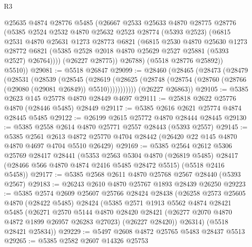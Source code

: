 \begin{lexlean}{R3}
\begin{coremodule}
            @25635
            @4874
            @28776
            @5485
            (@26667
              @2533
              @25633
              @4870
              @28775
              @28776
              (@5385
                @2524
                @2532
                @4870
                @25632
                @2523
                @28774
                (@5393 @2523)
                (@6815
                  @2531
                  @4870
                  @25631
                  @1273
                  @28773
                  @6821
                  (@6815
                    @2530
                    @4870
                    @25630
                    @1273
                    @28772
                    @6821
                    (@5385 @2528 @2018 @4870 @25629 @2527 @25881 (@5393 @2527) @26764))))
              (@26227 @28775))
            @26788)
          (@5518 @28776 @25892))
        @5510))
@29081 := @5518 @26847
@29099 := @28460
    (@28465
      (@28473
        (@28479
          (@28531
            (@28539
              (@28545
                (@28619
                  (@28625 (@28748 (@28754 (@28760 (@28766 (@29080 (@29081 @26849)) @5510)))))))))))
      (@26227 @26863))
@29105 := @5385 @2623 @145 @25778 @4870 @28449 @4697
@29111 := @25818 @2622 @25776 @4870 (@28446 @5485) @28449
@29117 := @5385 @2616 @2621 @25774 @4874 @28445 @5485
@29122 := @26199 @2615 @25772 @4870 @28444 @28445
@29130 := @5385 @2558 @2614 @4870 @25771 @2557 @28443 (@5393 @2557)
@29145 := @5385
    @2561
    @2613
    @4872
    @25770
    @4704
    @28442
    (@26420 @22 @145 @4870 @4870 @4697 @4704 @5510 @26429)
@29169 := @5385
    @2564
    @2612
    @5306
    @25769
    @28417
    @28441
    (@5353
      @2563
      @5304
      @4870
      (@26819 @5485)
      @28417
      (@28466 @566 @4870 @4874 @2416 @5485 @28472 @5515)
      (@5518 @2416 @5458))
@29177 := @5385 @2568 @2611 @4870 @25768 @2567 @28440 (@5393 @2567)
@29183 := @26243 @2610 @4870 @25767 @1893 @28439 @26250
@29223 := @5385
    @2574
    @2609
    @25607
    @25766
    @28424
    @28438
    (@26258
      @2573
      @25605
      @4870
      (@28422 @5485)
      @28424
      (@5385
        @2571
        @1913
        @5562
        @4874
        @28421
        @5485
        (@26271
          @2570
          @5144
          @4870
          @28420
          @28421
          (@26277 @2070 @4870 @4872 @1899 @26957 @26283 @27023)
          (@26227 @28420))
        @26314)
      (@5518 @28421 @25834))
@29229 := @5497 @2608 @4872 @25765 @5483 @28437 @5513
@29265 := @5385
    @2582
    @2607
    @14326
    @25753

\end{coremodule}
\end{lexlean}
